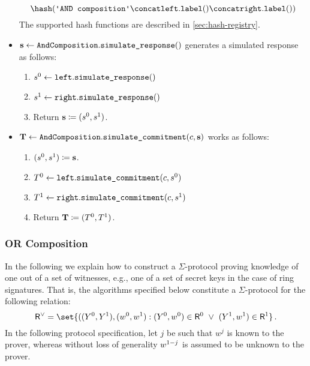 \documentclass[11pt]{article}
\begin{document}
\begin{itemize}
    \[
     \hash(\andlabel \concat \leftbranch.\labeltt() \concat \rightbranch.\labeltt())
   \]
   The supported hash functions are described in \cref{sec:hash-registry}.
  \item
  $\mathbf {s} \gets \texttt{AndComposition}.\texttt{simulate\_response}()$
   generates a simulated response as follows:
    \begin{enumerate}
      \item
        $s^0\gets\texttt{left}.\texttt{simulate\_response}()$
        \item $s^1\gets\texttt{right}.\texttt{simulate\_response}()$
      \item
        Return $\mathbf {s}\coloneqq(s^0,s^1)$.
    \end{enumerate}
  \item
  $\mathbf {T} \gets \texttt{AndComposition}.\texttt{simulate\_commitment}(c, \mathbf {s})$ works as follows:
    \begin{enumerate}
      \item
        $(s^0,s^1)\coloneqq\mathbf{s}$.
      \item
        $T^0\gets\texttt{left}.\texttt{simulate\_commitment}(c,s^0)$
        \item $T^1\gets\texttt{right}.\texttt{simulate\_commitment}(c,s^1)$
      \item
        Return $\mathbf {T}\coloneqq(T^0, T^1)$.
      \end{enumerate}
\end{itemize}



\subsubsection{OR Composition}
  In the following we explain how to construct a $\Sigma$-protocol proving knowledge of one out of a set of witnesses, e.g., one of a set of secret keys in the case of ring signatures.
  That is, the algorithms specified below constitute a $\Sigma$-protocol for the following relation:
\[
  \relation^\lor = \set{
    ((\statement^0,\statement^1),(\witness^0,\witness^1) :
    (\statement^0,\witness^0)\in \relation^0 ~\lor~ (\statement^1,\witness^1)\in\relation^1}\,.
\]
  In the following protocol specification, let $j$ be such that $w^j$ is known to the prover, whereas without loss of generality $w^{1-j}$ is assumed to be unknown to the prover.
\end{document}
